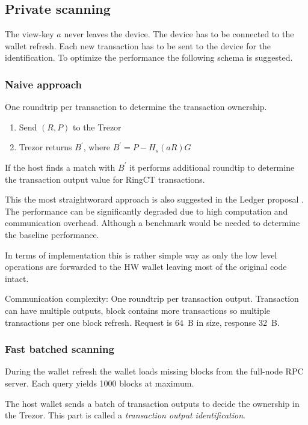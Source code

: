 \documentclass[]{article}
\begin{document}
\subsection{Private scanning}
The view-key $a$ never leaves the device. The device has to be connected
to the wallet refresh. 
Each new transaction has to be sent to the device for the identification.
To optimize the performance the following schema is suggested.

\subsubsection{Naive approach} One roundtrip per transaction to determine the transaction ownership. 
\begin{enumerate}
	\item Send $(R, P)$ to the Trezor
	\item Trezor returns $B^\prime$, where $B^\prime = P - H_s(aR)G$
\end{enumerate}

If the host finds a match with $B^\prime$ it performs additional roundtip to determine the transaction output value for RingCT transactions.

This the most straightworard approach is also suggested in the Ledger proposal \cite{ledger_doc}. The performance can be significantly degraded due to high computation and communication overhead. Although a benchmark would be needed to determine the baseline performance.

In terms of implementation this is rather simple way as only the low level operations are forwarded to the HW wallet leaving most of the original code intact.

Communication complexity: One roundtrip per transaction output. Transaction can have multiple outputs, block contains more transactions so multiple transactions per one block refresh. Request is 64~B in size, response 32~B.

\subsubsection{Fast batched scanning}
During the wallet refresh the wallet loads missing blocks from the full-node RPC server. Each query yields 1000 blocks at maximum. 

The host wallet sends a batch of transaction outputs to decide the ownership in the Trezor. This part is called a \emph{transaction output identification}.
\end{document}

